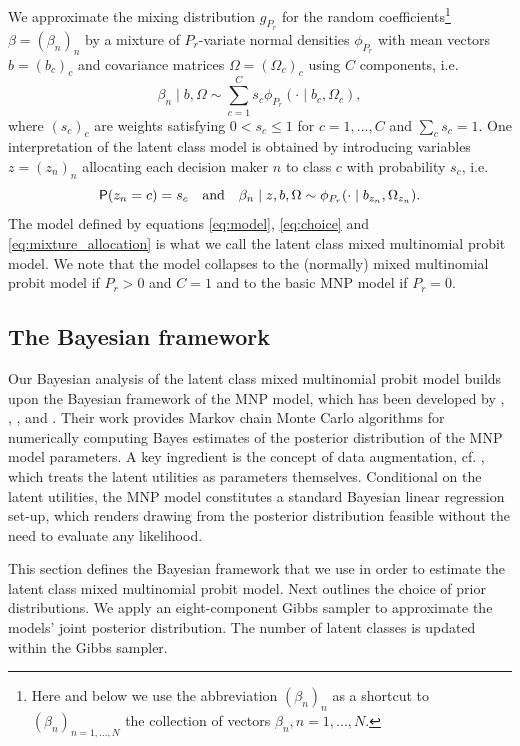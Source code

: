 \documentclass[article]{jss}
\begin{document}
We approximate the mixing distribution $g_{P_r}$ for the random coefficients\footnote{Here and below we use the abbreviation $(\beta_n)_n$ as a shortcut to $(\beta_n)_{n =1,...,N}$ the collection of vectors $\beta_n,n=1,...,N$.} $\beta=(\beta_n)_{n}$ by a mixture of $P_r$-variate normal densities $\phi_{P_r}$ with mean vectors $b=(b_c)_{c}$ and covariance matrices $\Omega=(\Omega_c)_{c}$ using $C$ components, i.e.
\begin{equation}
\label{eq:mixture}
\beta_n\mid b,\Omega \sim \sum_{c=1}^{C} s_c \phi_{P_r} (\cdot \mid b_c,\Omega_c),
\end{equation}
where $(s_c)_{c}$ are weights satisfying $0 < s_c\leq 1$ for $c=1,\dots,C$ and $\sum_c s_c=1$.
One interpretation of the latent class model is obtained by introducing variables $z=(z_n)_n$ allocating each decision maker $n$ to class $c$ with probability $s_c$, i.e.
\begin{equation}
\label{eq:mixture_allocation}
\mathsf{P}(z_n=c)=s_c \quad \text{and} \quad \beta_n \mid z,b,\Omega \sim \phi_{P_r}(\cdot \mid b_{z_n},\Omega_{z_n}).
\end{equation}
The model defined by equations \eqref{eq:model}, \eqref{eq:choice} and \eqref{eq:mixture_allocation} is what we call the latent class mixed multinomial probit model. We note that the model collapses to the (normally) mixed multinomial probit model if $P_r>0$ and $C=1$ and to the basic MNP model if $P_r=0$.


\subsection{The Bayesian framework} \label{subsec:bayes}

Our Bayesian analysis of the latent class mixed multinomial probit model builds upon the Bayesian framework of the MNP model, which has been developed by \cite{McCulloch:94}, \cite{Nobile:98}, \cite{Allenby:98}, and \cite{Imai:05}. Their work provides Markov chain Monte Carlo algorithms for numerically computing Bayes estimates of the posterior distribution of the MNP model parameters. A key ingredient is the concept of data augmentation, cf. \cite{Albert:93}, which treats the latent utilities as parameters themselves. Conditional on the latent utilities, the MNP model constitutes a standard Bayesian linear regression set-up, which renders drawing from the posterior distribution feasible without the need to evaluate any likelihood.

This section defines the Bayesian framework that we use in order to estimate the latent class mixed multinomial probit model. Next outlines the choice of prior distributions. We apply an eight-component Gibbs sampler to approximate the models' joint posterior distribution. The number of latent classes is updated within the Gibbs sampler.
\end{document}
